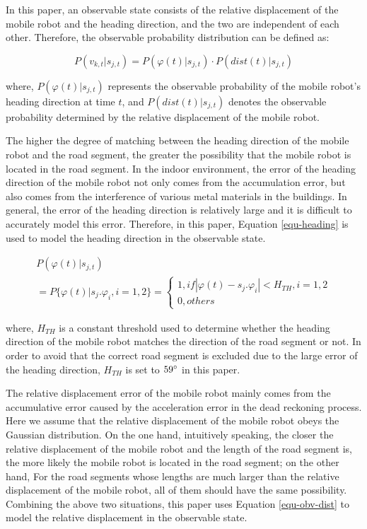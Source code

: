 \documentclass{llncs}
\begin{document}
In this paper, an observable state consists of the relative displacement of the mobile robot and the heading direction, and the two are independent of each other. Therefore, the observable probability distribution can be defined as:

\begin{equation}
	P({v_{k,t}}|{s_{j,t}}) = P(\varphi (t)|{s_{j,t}}) \cdot P(dist(t)|{s_{j,t}})
\end{equation}

where, $P(\varphi (t)|{s_{j,t}})$ represents the observable probability of the mobile robot's heading direction at time $t$, and $P(dist(t)|{s_{j,t}})$ denotes the observable probability determined by the relative displacement of the mobile robot.

The higher the degree of matching between the heading direction of the mobile robot and the road segment, the greater the possibility that the mobile robot is located in the road segment. In the indoor environment, the error of the heading direction of the mobile robot not only comes from the accumulation error, but also comes from the interference of various metal materials in the buildings. In general, the error of the heading direction is relatively large and it is difficult to accurately model this error. Therefore, in this paper, Equation \ref{equ-heading} is used to model the heading direction in the observable state.

\begin{equation}
\label{equ-heading}
\begin{array}{l}
P(\varphi (t)|{s_{j,t}})\\
= P\{ \varphi (t)|{s_j}.{\varphi _i},i = 1,2\}  = \left\{ {\begin{array}{*{20}{l}}
	{1,if|\varphi (t) - {s_j}.{\varphi _i}| < {H_{TH}},i = 1,2}\\
	{0,others}
	\end{array}} \right.
\end{array}
\end{equation}

where, $H_{TH}$ is a constant threshold used to determine whether the heading direction of the mobile robot matches the direction of the road segment or not. In order to avoid that the correct road segment is excluded due to the large error of the heading direction, $H_{TH}$ is set to $59{\rm{^\circ }}$ in this paper.

The relative displacement error of the mobile robot mainly comes from the accumulative error caused by the acceleration error in the dead reckoning process. Here we assume that the relative displacement of the mobile robot obeys the Gaussian distribution. On the one hand, intuitively speaking, the closer the relative displacement of the mobile robot and the length of the road segment is, the more likely the mobile robot is located in the road segment; on the other hand, For the road segments whose lengths are much larger than the relative displacement of the mobile robot, all of them should have the same possibility. Combining the above two situations, this paper uses Equation \ref{equ-obv-dist} to model the relative displacement in the observable state.
\end{document}
